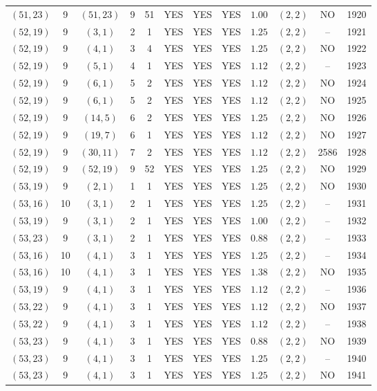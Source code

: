 \begin{longtable}{|c|c|c|c|c|c|c|c|c|c|c|c|}
$(51,23)$ & 9 & $(51,23)$ & 9 & 51 & YES & YES & YES & $1.00$ & $(2,2)$ & NO & 1920\\
$(52,19)$ & 9 & $(3,1)$ & 2 & 1 & YES & YES & YES & $1.25$ & $(2,2)$ & -- & 1921\\
$(52,19)$ & 9 & $(4,1)$ & 3 & 4 & YES & YES & YES & $1.25$ & $(2,2)$ & NO & 1922\\
$(52,19)$ & 9 & $(5,1)$ & 4 & 1 & YES & YES & YES & $1.12$ & $(2,2)$ & -- & 1923\\
$(52,19)$ & 9 & $(6,1)$ & 5 & 2 & YES & YES & YES & $1.12$ & $(2,2)$ & NO & 1924\\
$(52,19)$ & 9 & $(6,1)$ & 5 & 2 & YES & YES & YES & $1.12$ & $(2,2)$ & NO & 1925\\
$(52,19)$ & 9 & $(14,5)$ & 6 & 2 & YES & YES & YES & $1.25$ & $(2,2)$ & NO & 1926\\
$(52,19)$ & 9 & $(19,7)$ & 6 & 1 & YES & YES & YES & $1.12$ & $(2,2)$ & NO & 1927\\
$(52,19)$ & 9 & $(30,11)$ & 7 & 2 & YES & YES & YES & $1.12$ & $(2,2)$ & 2586 & 1928\\
$(52,19)$ & 9 & $(52,19)$ & 9 & 52 & YES & YES & YES & $1.25$ & $(2,2)$ & NO & 1929\\
$(53,19)$ & 9 & $(2,1)$ & 1 & 1 & YES & YES & YES & $1.25$ & $(2,2)$ & NO & 1930\\
$(53,16)$ & 10 & $(3,1)$ & 2 & 1 & YES & YES & YES & $1.25$ & $(2,2)$ & -- & 1931\\
$(53,19)$ & 9 & $(3,1)$ & 2 & 1 & YES & YES & YES & $1.00$ & $(2,2)$ & -- & 1932\\
$(53,23)$ & 9 & $(3,1)$ & 2 & 1 & YES & YES & YES & $0.88$ & $(2,2)$ & -- & 1933\\
$(53,16)$ & 10 & $(4,1)$ & 3 & 1 & YES & YES & YES & $1.25$ & $(2,2)$ & -- & 1934\\
$(53,16)$ & 10 & $(4,1)$ & 3 & 1 & YES & YES & YES & $1.38$ & $(2,2)$ & NO & 1935\\
$(53,19)$ & 9 & $(4,1)$ & 3 & 1 & YES & YES & YES & $1.12$ & $(2,2)$ & -- & 1936\\
$(53,22)$ & 9 & $(4,1)$ & 3 & 1 & YES & YES & YES & $1.12$ & $(2,2)$ & NO & 1937\\
$(53,22)$ & 9 & $(4,1)$ & 3 & 1 & YES & YES & YES & $1.12$ & $(2,2)$ & -- & 1938\\
$(53,23)$ & 9 & $(4,1)$ & 3 & 1 & YES & YES & YES & $0.88$ & $(2,2)$ & NO & 1939\\
$(53,23)$ & 9 & $(4,1)$ & 3 & 1 & YES & YES & YES & $1.25$ & $(2,2)$ & -- & 1940\\
$(53,23)$ & 9 & $(4,1)$ & 3 & 1 & YES & YES & YES & $1.25$ & $(2,2)$ & NO & 1941\\

\end{longtable}
